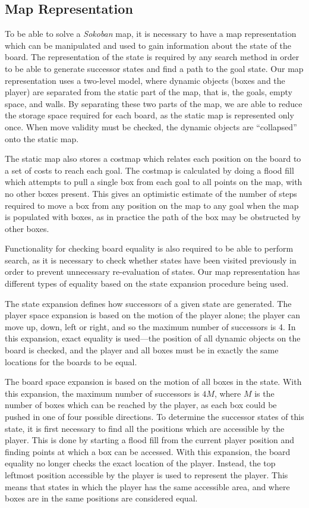 \documentclass[a4paper,11pt]{article}
\begin{document}
\subsection{Map Representation}

To be able to solve a \emph{Sokoban} map, it is necessary to have a map
representation which can be manipulated and used to gain information about the
state of the board. The representation of the state is required by any search
method in order to be able to generate successor states and find a path to the
goal state. Our map representation uses a two-level model, where dynamic objects
(boxes and the player) are separated from the static part of the map, that is,
the goals, empty space, and walls. By separating these two parts of the map, we
are able to reduce the storage space required for each board, as the static map
is represented only once. When move validity must be checked, the dynamic
objects are ``collapsed'' onto the static map.

The static map also stores a costmap which relates each position on the board to
a set of costs to reach each goal. The costmap is calculated by doing a flood
fill which attempts to pull a single box from each goal to all points on the
map, with no other boxes present. This gives an optimistic estimate of the
number of steps required to move a box from any position on the map to any goal
when the map is populated with boxes, as in practice the path of the box may be
obstructed by other boxes.

Functionality for checking board equality is also required to be able to perform
search, as it is necessary to check whether states have been visited previously
in order to prevent unnecessary re-evaluation of states. Our map representation
has different types of equality based on the state expansion procedure being
used.

The state expansion defines how successors of a given state are generated. The
player space expansion is based on the motion of the player alone; the player
can move up, down, left or right, and so the maximum number of successors is
4. In this expansion, exact equality is used---the position of all dynamic
objects on the board is checked, and the player and all boxes must be in exactly
the same locations for the boards to be equal.

The board space expansion is based on the motion of all boxes in the state. With
this expansion, the maximum number of successors is $4M$, where $M$ is the
number of boxes which can be reached by the player, as each box could be pushed
in one of four possible directions. To determine the successor states of this
state, it is first necessary to find all the positions which are accessible by
the player. This is done by starting a flood fill from the current player
position and finding points at which a box can be accessed. With this expansion,
the board equality no longer checks the exact location of the player. Instead,
the top leftmost position accessible by the player is used to represent the
player. This means that states in which the player has the same accessible area,
and where boxes are in the same positions are considered equal.
\end{document}
